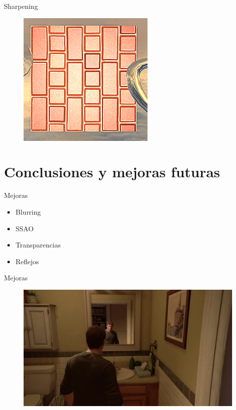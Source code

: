 \documentclass[table]{beamer}
\begin{document}
\begin{frame}[fragile]{Sharpening}
    \begin{figure}
        \includegraphics[width=\linewidth]{./figures/sharpONsmall.png}
    \end{figure}
\end{frame}

\section{Conclusiones y mejoras futuras}

\begin{frame}[fragile]{Mejoras}
    \begin{itemize}
        \item Blurring
        \item SSAO
        \item Transparencias
        \item Reflejos
    \end{itemize}
\end{frame}

\begin{frame}[fragile]{Mejoras}
    \begin{figure}
        \includegraphics[width=\linewidth]{./figures/reflection.png}
    \end{figure}
\end{frame}

\begin{frame}
    \titlepage
\end{frame}
\end{document}
